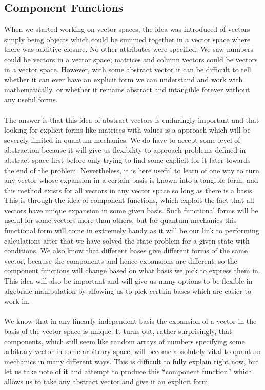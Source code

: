 \subsection{Component Functions}
When we started working on vector spaces, the idea was introduced of vectors simply being objects which could be summed together in a vector space where there was additive closure. No other attributes were specified. We saw numbers could be vectors in a vector space; matrices and column vectors could be vectors in a vector space. However, with some abstract vector it can be difficult to tell whether it can ever have an explicit form we can understand and work with mathematically, or whether it remains abstract and intangible forever without any useful forms.
\\\\
The answer is that this idea of abstract vectors is enduringly important and that looking for explicit forms like matrices with values is a approach which will be severely limited in quantum mechanics. We do have to accept some level of abstraction because it will give us flexibility to approach problems defined in abstract space first before only trying to find some explicit for it later towards the end of the problem. Nevertheless, it is here useful to learn of one way to turn any vector whose expansion in a certain basis is known into a tangible form, and this method exists for all vectors in any vector space so long as there is a basis. This is through the idea of component functions, which exploit the fact that all vectors have unique expansion in some given basis. Such functional forms will be useful for some vectors more than others, but for quantum mechanics this functional form will come in extremely handy as it will be our link to performing calculations after that we have solved the state problem for a given state with conditions. We also know that different bases give different forms of the same vector, because the components and hence expansions are different, so the component functions will change based on what basis we pick to express them in. This idea will also be important and will give us many options to be flexible in algebraic manipulation by allowing us to pick certain bases which are easier to work in.
\\\\
We know that in any linearly independent basis the expansion of a vector in the basis of the vector space is unique. It turns out, rather surprisingly, that components, which still seem like random arrays of numbers specifying some arbitrary vector in some arbitrary space, will become absolutely vital to quantum mechanics in many different ways. This is difficult to fully explain right now, but let us take note of it and attempt to produce this ``component function'' which allows us to take any abstract vector and give it an explicit form.
